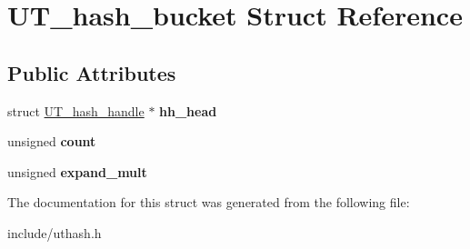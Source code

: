 \hypertarget{struct_u_t__hash__bucket}{\section{U\+T\+\_\+hash\+\_\+bucket Struct Reference}
\label{struct_u_t__hash__bucket}
}
\subsection*{Public Attributes}
\begin{DoxyCompactItemize}
\item 
\hypertarget{struct_u_t__hash__bucket_a785a785132212378bb28fb4341cfecaf}{struct \hyperlink{struct_u_t__hash__handle}{U\+T\+\_\+hash\+\_\+handle} $\ast$ {\bfseries hh\+\_\+head}}\label{struct_u_t__hash__bucket_a785a785132212378bb28fb4341cfecaf}

\item 
\hypertarget{struct_u_t__hash__bucket_a5d20cc12bdcbde360398910eefb45634}{unsigned {\bfseries count}}\label{struct_u_t__hash__bucket_a5d20cc12bdcbde360398910eefb45634}

\item 
\hypertarget{struct_u_t__hash__bucket_a9b739c1b69c141e8198c0c64af643b2b}{unsigned {\bfseries expand\+\_\+mult}}\label{struct_u_t__hash__bucket_a9b739c1b69c141e8198c0c64af643b2b}

\end{DoxyCompactItemize}


The documentation for this struct was generated from the following file\+:\begin{DoxyCompactItemize}
\item 
include/uthash.\+h\end{DoxyCompactItemize}
